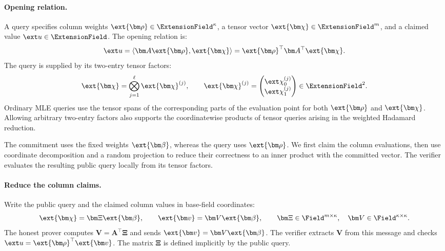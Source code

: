 \paragraph{Opening relation.}
A query specifies column weights
\(\ext{\bm\rho}\in\ExtensionField^\kappa\), a tensor vector
\(\ext{\bm\chi}\in\ExtensionField^m\), and a claimed value
\(\ext u\in\ExtensionField\). The opening relation is:
\begin{equation}
    \ext u
    =\langle\bm A\ext{\bm\rho},\ext{\bm\chi}\rangle
    =\ext{\bm\rho}^{\top}\bm A^\top\ext{\bm\chi}.
\label{eq:pcs-opening-relation}
\end{equation}
The query is supplied by its two-entry tensor factors:
\[
    \ext{\bm\chi}
    =\bigotimes_{j=1}^{\ell}\ext{\bm\chi}^{(j)},
    \qquad
    \ext{\bm\chi}^{(j)}
    =
    \begin{pmatrix}
        \ext\chi^{(j)}_0\\
        \ext\chi^{(j)}_1
    \end{pmatrix}
    \in\ExtensionField^2.
\]
Ordinary MLE queries use the tensor spans of the corresponding
parts of the evaluation point for both \(\ext{\bm\rho}\) and
\(\ext{\bm\chi}\). Allowing arbitrary two-entry factors also
supports the coordinatewise products of tensor queries arising
in the weighted Hadamard reduction.

\medskip{}

The commitment uses the fixed weights \(\ext{\bm\beta}\), whereas
the query uses \(\ext{\bm\rho}\). We first claim the column
evaluations, then use coordinate decomposition and a random
projection to reduce their correctness to an inner product with
the committed vector. The verifier evaluates the resulting public
query locally from its tensor factors.

\paragraph{Reduce the column claims.}
Write the public query and the claimed column values in base-field
coordinates:
\[
    \ext{\bm\chi}=\bm\Xi\ext{\bm\beta},
    \qquad
    \ext{\bm v}=\bm V\ext{\bm\beta},
    \qquad
    \bm\Xi\in\Field^{m\times\kappa},
    \quad
    \bm V\in\Field^{\kappa\times\kappa}.
\]
The honest prover computes \(\bm V=\bm A^\top\bm\Xi\) and sends
\(\ext{\bm v}=\bm V\ext{\bm\beta}\).
The verifier extracts \(\bm V\) from this message and checks
\(\ext u=\ext{\bm\rho}^{\top}\ext{\bm v}\).
The matrix \(\bm\Xi\) is defined implicitly by the public query.

